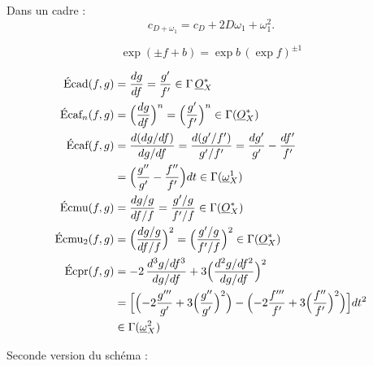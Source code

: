 \documentclass[11pt,a4paper]{article}
\begin{document}
Dans un cadre :
\[
c_{D+\omega_1} = c_D + 2D\omega_1 + \omega_1^2 .
\]

\[
\exp(\pm f + b) = \exp b\,(\exp f)^{\pm 1}
\]

\[
\begin{aligned}
\text{Écad}(f,g) &= \frac{dg}{df} = \frac{g'}{f'} \in \Gamma\,\underline{O}^*_X\\
\text{Écaf}_n(f,g) &= \Bigl(\frac{dg}{df}\Bigr)^n = \Bigl(\frac{g'}{f'}\Bigr)^n \in \Gamma(\underline{O}^*_X)\\
\text{Écaf}(f,g) &= \frac{d(dg/df)}{dg/df} = \frac{d(g'/f')}{g'/f'} = \frac{dg'}{g'} - \frac{df'}{f'}\\
&= \Bigl(\frac{g''}{g'} - \frac{f''}{f'}\Bigr)dt \in \Gamma(\underline{\omega}^1_X)\\
\text{Écmu}(f,g) &= \frac{dg/g}{df/f} = \frac{g'/g}{f'/f} \in \Gamma(\underline{O}^*_X)\\
\text{Écmu}_2(f,g) &= \Bigl(\frac{dg/g}{df/f}\Bigr)^2 = \Bigl(\frac{g'/g}{f'/f}\Bigr)^2 \in \Gamma(\underline{O}^*_X)\\
\text{Écpr}(f,g) &= -2\,\frac{d^3g/df^3}{dg/df} + 3\Bigl(\frac{d^2g/df^2}{dg/df}\Bigr)^2\\
&= \Bigl[\Bigl(-2\frac{g'''}{g'} + 3\Bigl(\frac{g''}{g'}\Bigr)^2\Bigr) - \Bigl(-2\frac{f'''}{f'} + 3\Bigl(\frac{f''}{f'}\Bigr)^2\Bigr)\Bigr]dt^2\\
&\in \Gamma(\underline{\omega}^2_X)
\end{aligned}
\]

Seconde version du schéma :

\end{document}
